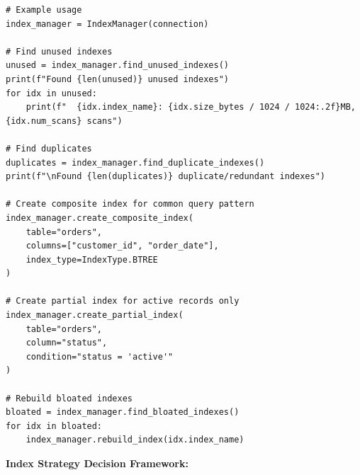 \begin{lstlisting}[style=python, caption=IndexManager with Smart Recommendations]
# Example usage
index_manager = IndexManager(connection)

# Find unused indexes
unused = index_manager.find_unused_indexes()
print(f"Found {len(unused)} unused indexes")
for idx in unused:
    print(f"  {idx.index_name}: {idx.size_bytes / 1024 / 1024:.2f}MB, {idx.num_scans} scans")

# Find duplicates
duplicates = index_manager.find_duplicate_indexes()
print(f"\nFound {len(duplicates)} duplicate/redundant indexes")

# Create composite index for common query pattern
index_manager.create_composite_index(
    table="orders",
    columns=["customer_id", "order_date"],
    index_type=IndexType.BTREE
)

# Create partial index for active records only
index_manager.create_partial_index(
    table="orders",
    column="status",
    condition="status = 'active'"
)

# Rebuild bloated indexes
bloated = index_manager.find_bloated_indexes()
for idx in bloated:
    index_manager.rebuild_index(idx.index_name)
\end{lstlisting}

\textbf{Index Strategy Decision Framework:}

